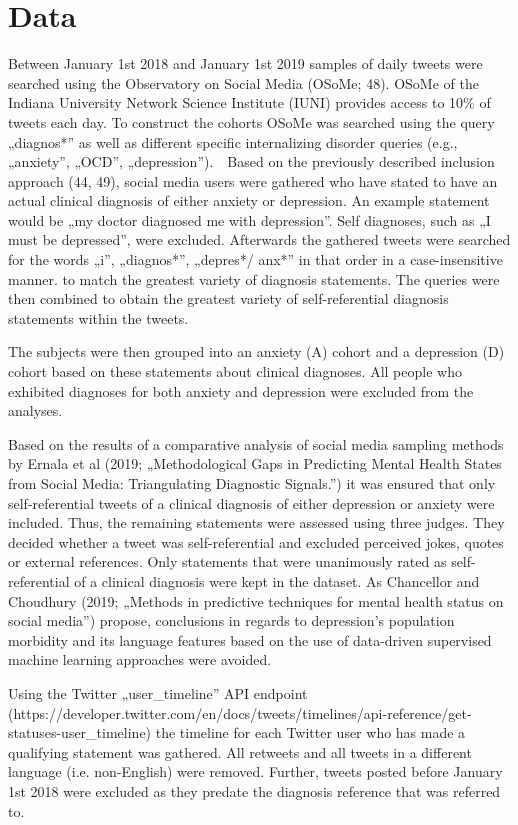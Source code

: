 \section{Data}
\label{sec:data}

Between January 1st 2018 and January 1st 2019 samples of daily tweets were searched using the Observatory on Social Media (OSoMe; 48). OSoMe of the Indiana University Network Science Institute (IUNI) provides access to 10\% of tweets each day. To construct the cohorts OSoMe was searched using the query „diagnos*” as well as different specific internalizing disorder queries (e.g., „anxiety”, „OCD”, „depression”).  Based on the previously described inclusion approach (44, 49), social media users were gathered who have stated to have an actual clinical diagnosis of either anxiety or depression. An example statement would be „my doctor diagnosed me with depression”. Self diagnoses, such as „I must be depressed”, were excluded. Afterwards the gathered tweets were searched for the words „i”, „diagnos*”, „depres*/ anx*” in that order in a case-insensitive manner. to match the greatest variety of diagnosis statements. The queries were then combined to obtain the greatest variety of self-referential diagnosis statements within the tweets. 

The subjects were then grouped into an anxiety (A) cohort and a depression (D) cohort based on these statements about clinical diagnoses. All people who exhibited diagnoses for both anxiety and depression were excluded from the analyses.

Based on the results of a comparative analysis of social media sampling methods by Ernala et al (2019; „Methodological Gaps in Predicting Mental Health States from Social Media: Triangulating Diagnostic Signals.”) it was ensured that only self-referential tweets of a clinical diagnosis of either depression or anxiety were included. Thus, the remaining statements were assessed using three judges. They decided whether a tweet was self-referential and excluded perceived jokes, quotes or external references. Only statements that were unanimously rated as self-referential of a clinical diagnosis were kept in the dataset. As Chancellor and Choudhury (2019; „Methods in predictive techniques for mental health status on social media”) propose, conclusions in regards to depression’s population morbidity and its language features based on the use of data-driven supervised machine learning approaches were avoided. 

Using the Twitter „user\_timeline” API endpoint (https://developer.twitter.com/en/docs/tweets/timelines/api-reference/get-statuses-user\_timeline) the timeline for each Twitter user who has made a qualifying statement was gathered. All retweets and all tweets in a different language (i.e. non-English) were removed. Further, tweets posted before January 1st 2018 were excluded as they predate the diagnosis reference that was referred to. 


